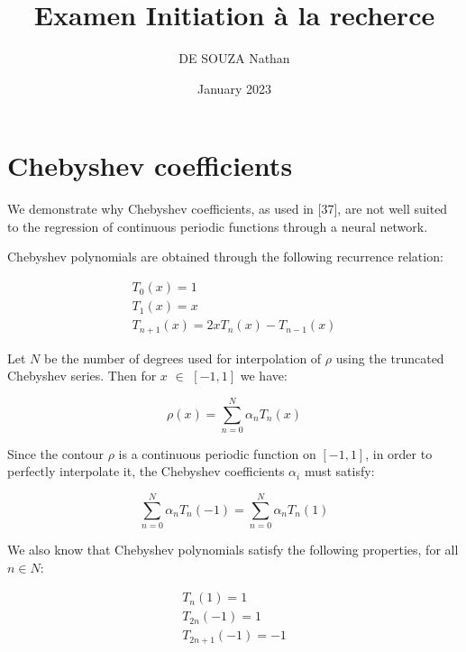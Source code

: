 \documentclass[10pt,twocolumn,letterpaper]{article}
\title{Examen Initiation à la recherce}
\author{DE SOUZA Nathan}
\date{January 2023}
\begin{document}
\maketitle

\section{Chebyshev coefficients}


    We demonstrate why Chebyshev coefficients, as used
in [37], are not well suited to the regression of continuous
periodic functions through a neural network.

Chebyshev polynomials are obtained through the following
recurrence relation:

\begin{equation}
    \begin{array}{c}
          T_0 \left(x\right) = 1 \\ 
          T_1 \left(x\right) = x \\
          T_{n+1} \left(x\right) = 2 x T_n \left(x\right) - T_{n-1} \left(x\right)
    \end{array}
\end{equation}

Let $N$ be the number of degrees used for interpolation of $\rho$ using the truncated Chebyshev series. Then for $x$ $\in$ $\left[ -1, 1 \right] $ we have:

\begin{equation}
    \rho \left(x\right) = \sum_{n=0}^{N} \alpha_n T_n \left(x\right)
\end{equation}

Since the contour $\rho$ is a continuous periodic function on
$\left[ -1, 1 \right] $, in order to perfectly interpolate it, the Chebyshev
coefficients $\alpha_i$ must satisfy:

\begin{equation}
    \sum_{n=0}^{N} \alpha_n T_n \left(-1\right) = \sum_{n=0}^{N} \alpha_n T_n \left(1\right)
\end{equation}

We also know that Chebyshev polynomials satisfy the
following properties, for all $n \in N $:

\begin{equation}
    \begin{array}{c}
          T_n \left(1\right) = 1 \\ 
          T_{2n} \left(-1\right) = 1 \\
          T_{2n+1} \left(-1\right) = -1
    \end{array}
\end{equation}
\end{document}
